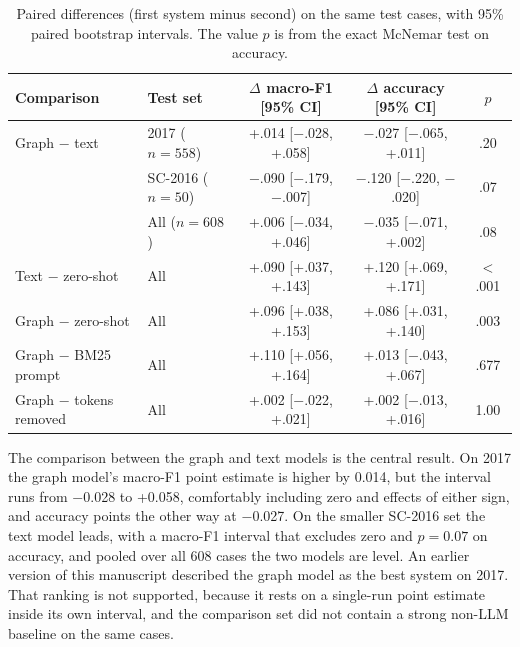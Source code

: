 \documentclass[journal]{IEEEtran}
\begin{document}
\begin{table}[!t]\centering\footnotesize
\setlength{\tabcolsep}{4pt}
\caption{Paired differences (first system minus second) on the same test cases, with 95\% paired bootstrap intervals. The value $p$ is from the exact McNemar test on accuracy.}\label{tab:paired}
\begin{tabular}{@{}llccc@{}}\toprule
Comparison & Test set & $\Delta$ macro-F1 [95\% CI] & $\Delta$ accuracy [95\% CI] & $p$\\\midrule
Graph $-$ text & 2017 ($n=558$) & +.014 [$-$.028, +.058] & $-$.027 [$-$.065, +.011] & .20\\
& SC-2016 ($n=50$) & $-$.090 [$-$.179, $-$.007] & $-$.120 [$-$.220, $-$.020] & .07\\
& All ($n=608$) & +.006 [$-$.034, +.046] & $-$.035 [$-$.071, +.002] & .08\\
Text $-$ zero-shot & All & +.090 [+.037, +.143] & +.120 [+.069, +.171] & $<$.001\\
Graph $-$ zero-shot & All & +.096 [+.038, +.153] & +.086 [+.031, +.140] & .003\\
Graph $-$ BM25 prompt & All & +.110 [+.056, +.164] & +.013 [$-$.043, +.067] & .677\\
Graph $-$ tokens removed & All & +.002 [$-$.022, +.021] & +.002 [$-$.013, +.016] & 1.00\\\bottomrule
\end{tabular}\end{table}

The comparison between the graph and text models is the central result. On 2017 the graph model's macro-F1 point estimate is higher by 0.014, but the interval runs from $-$0.028 to +0.058, comfortably including zero and effects of either sign, and accuracy points the other way at $-$0.027. On the smaller SC-2016 set the text model leads, with a macro-F1 interval that excludes zero and $p=0.07$ on accuracy, and pooled over all 608 cases the two models are level. An earlier version of this manuscript described the graph model as the best system on 2017. That ranking is not supported, because it rests on a single-run point estimate inside its own interval, and the comparison set did not contain a strong non-LLM baseline on the same cases.
\end{document}
